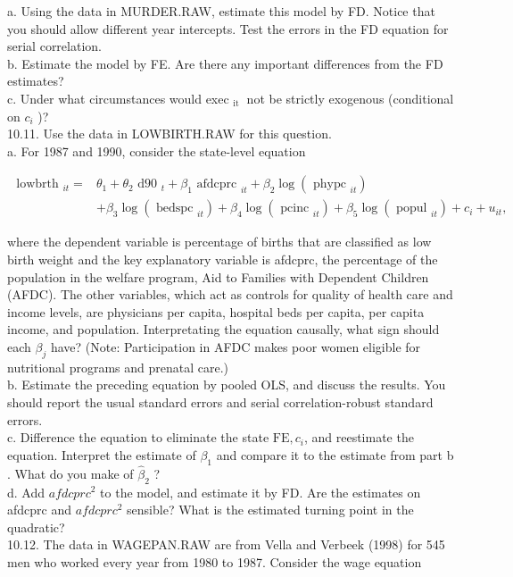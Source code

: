 \documentclass[10pt]{article}
\begin{document}
a. Using the data in MURDER.RAW, estimate this model by FD. Notice that you should allow different year intercepts. Test the errors in the FD equation for serial correlation.\\
b. Estimate the model by FE. Are there any important differences from the FD estimates?\\
c. Under what circumstances would exec $_{\text {it }}$ not be strictly exogenous (conditional on $c_{i}$ )?\\
10.11. Use the data in LOWBIRTH.RAW for this question.\\
a. For 1987 and 1990, consider the state-level equation

$$
\begin{aligned}
\text { lowbrth }_{i t}= & \theta_{1}+\theta_{2} \text { d90 }_{t}+\beta_{1} \text { afdcprc }_{i t}+\beta_{2} \log \left(\text { phypc }_{i t}\right) \\
& +\beta_{3} \log \left(\text { bedspc }_{i t}\right)+\beta_{4} \log \left(\text { pcinc }_{i t}\right)+\beta_{5} \log \left(\text { popul }_{i t}\right)+c_{i}+u_{i t},
\end{aligned}
$$

where the dependent variable is percentage of births that are classified as low birth weight and the key explanatory variable is afdcprc, the percentage of the population in the welfare program, Aid to Families with Dependent Children (AFDC). The other variables, which act as controls for quality of health care and income levels, are physicians per capita, hospital beds per capita, per capita income, and population. Interpretating the equation causally, what sign should each $\beta_{j}$ have? (Note: Participation in AFDC makes poor women eligible for nutritional programs and prenatal care.)\\
b. Estimate the preceding equation by pooled OLS, and discuss the results. You should report the usual standard errors and serial correlation-robust standard errors.\\
c. Difference the equation to eliminate the state $\mathrm{FE}, c_{i}$, and reestimate the equation. Interpret the estimate of $\beta_{1}$ and compare it to the estimate from part b . What do you make of $\hat{\beta}_{2}$ ?\\
d. Add $a f d c p r c^{2}$ to the model, and estimate it by FD. Are the estimates on afdcprc and $a f d c p r c^{2}$ sensible? What is the estimated turning point in the quadratic?\\
10.12. The data in WAGEPAN.RAW are from Vella and Verbeek (1998) for 545 men who worked every year from 1980 to 1987. Consider the wage equation
\end{document}
